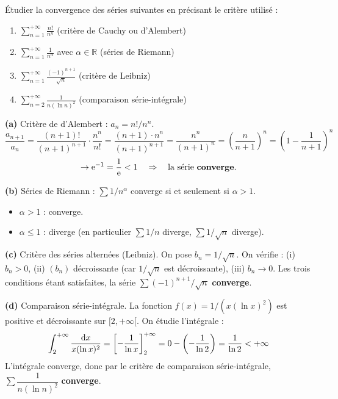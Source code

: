 \documentclass[12pt,a4paper]{article}
\begin{document}
\begin{boiteexercice}
Étudier la convergence des séries suivantes en précisant le critère utilisé :
\begin{enumerate}[label=(\alph*)]
  \item $\displaystyle\sum_{n=1}^{+\infty}\frac{n!}{n^n}$ \quad (critère de Cauchy ou d'Alembert)
  \item $\displaystyle\sum_{n=1}^{+\infty}\frac{1}{n^\alpha}$ avec $\alpha\in\mathbb{R}$ \quad (séries de Riemann)
  \item $\displaystyle\sum_{n=1}^{+\infty}\frac{(-1)^{n+1}}{\sqrt{n}}$ \quad (critère de Leibniz)
  \item $\displaystyle\sum_{n=2}^{+\infty}\frac{1}{n(\ln n)^2}$ \quad (comparaison série-intégrale)
\end{enumerate}
\end{boiteexercice}

\begin{boitecorrige}
\textbf{(a)} Critère de d'Alembert : $a_n = n!/n^n$.
\[
\frac{a_{n+1}}{a_n} = \frac{(n+1)!}{(n+1)^{n+1}}\cdot\frac{n^n}{n!} = \frac{(n+1)\cdot n^n}{(n+1)^{n+1}} = \frac{n^n}{(n+1)^n} = \left(\frac{n}{n+1}\right)^n = \left(1-\frac{1}{n+1}\right)^n
\]
\[
\to \mathrm{e}^{-1} = \frac{1}{\mathrm{e}} < 1 \quad\Rightarrow\quad \text{la série \textbf{converge}.}
\]

\textbf{(b)} Séries de Riemann : $\sum 1/n^\alpha$ converge si et seulement si $\alpha > 1$.
\begin{itemize}[nosep]
  \item $\alpha > 1$ : converge.
  \item $\alpha \leq 1$ : diverge (en particulier $\sum 1/n$ diverge, $\sum 1/\sqrt{n}$ diverge).
\end{itemize}

\textbf{(c)} Critère des séries alternées (Leibniz). On pose $b_n = 1/\sqrt{n}$. On vérifie : (i) $b_n > 0$, (ii) $(b_n)$ décroissante (car $1/\sqrt{n}$ est décroissante), (iii) $b_n \to 0$. Les trois conditions étant satisfaites, la série $\sum(-1)^{n+1}/\sqrt{n}$ \textbf{converge}.

\textbf{(d)} Comparaison série-intégrale. La fonction $f(x) = 1/(x(\ln x)^2)$ est positive et décroissante sur $[2,+\infty[$. On étudie l'intégrale :
\[
\int_2^{+\infty}\frac{\mathrm{d} x}{x(\ln x)^2} = \left[-\frac{1}{\ln x}\right]_2^{+\infty} = 0 - \left(-\frac{1}{\ln 2}\right) = \frac{1}{\ln 2} < +\infty
\]
L'intégrale converge, donc par le critère de comparaison série-intégrale, $\sum\dfrac{1}{n(\ln n)^2}$ \textbf{converge}.
\end{boitecorrige}
\end{document}

